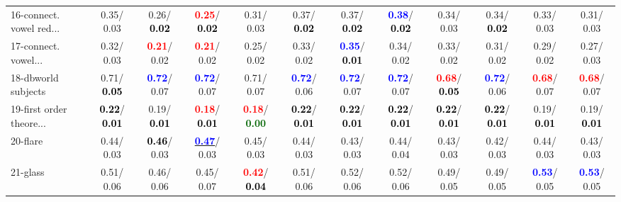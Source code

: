 \begin{table}[h]
\begin{center}
{\begin{tabular}{lc|c|c|c|c|c|c|c|c|c|c}
16-connect. vowel red... &   0.35/  0.03 &   0.26/\textcolor{black}{\textbf{  0.02}} & \textcolor{red}{\textbf{  0.25}}/\textcolor{black}{\textbf{  0.02}} &   0.31/  0.03 &   0.37/\textcolor{black}{\textbf{  0.02}} &   0.37/\textcolor{black}{\textbf{  0.02}} & \textcolor{blue}{\textbf{  0.38}}/\textcolor{black}{\textbf{  0.02}} &   0.34/  0.03 &   0.34/\textcolor{black}{\textbf{  0.02}} &   0.33/  0.03 &   0.31/  0.03 \\
17-connect. vowel... &   0.32/  0.03 & \textcolor{red}{\textbf{  0.21}}/  0.02 & \textcolor{red}{\textbf{  0.21}}/  0.02 &   0.25/  0.02 &   0.33/  0.02 & \textcolor{blue}{\textbf{  0.35}}/\textcolor{black}{\textbf{  0.01}} &   0.34/  0.02 &   0.33/  0.02 &   0.31/  0.02 &   0.29/  0.02 &   0.27/  0.03 \\
18-dbworld subjects &   0.71/\textcolor{black}{\textbf{  0.05}} & \textcolor{blue}{\textbf{  0.72}}/  0.07 & \textcolor{blue}{\textbf{  0.72}}/  0.07 &   0.71/  0.07 & \textcolor{blue}{\textbf{  0.72}}/  0.06 & \textcolor{blue}{\textbf{  0.72}}/  0.07 & \textcolor{blue}{\textbf{  0.72}}/  0.07 & \textcolor{red}{\textbf{  0.68}}/\textcolor{black}{\textbf{  0.05}} & \textcolor{blue}{\textbf{  0.72}}/  0.06 & \textcolor{red}{\textbf{  0.68}}/  0.07 & \textcolor{red}{\textbf{  0.68}}/  0.07 \\
19-first order theore... & \textcolor{black}{\textbf{  0.22}}/\textcolor{black}{\textbf{  0.01}} &   0.19/\textcolor{black}{\textbf{  0.01}} & \textcolor{red}{\textbf{  0.18}}/\textcolor{black}{\textbf{  0.01}} & \textcolor{red}{\textbf{  0.18}}/\textcolor{darkgreen}{\textbf{  0.00}} & \textcolor{black}{\textbf{  0.22}}/\textcolor{black}{\textbf{  0.01}} & \textcolor{black}{\textbf{  0.22}}/\textcolor{black}{\textbf{  0.01}} & \textcolor{black}{\textbf{  0.22}}/\textcolor{black}{\textbf{  0.01}} & \textcolor{black}{\textbf{  0.22}}/\textcolor{black}{\textbf{  0.01}} & \textcolor{black}{\textbf{  0.22}}/\textcolor{black}{\textbf{  0.01}} &   0.19/\textcolor{black}{\textbf{  0.01}} &   0.19/\textcolor{black}{\textbf{  0.01}} \\
20-flare &   0.44/  0.03 & \textcolor{black}{\textbf{  0.46}}/  0.03 & \underline{\textcolor{blue}{\textbf{  0.47}}}/  0.03 &   0.45/  0.03 &   0.44/  0.03 &   0.43/  0.03 &   0.44/  0.04 &   0.43/  0.03 &   0.42/  0.03 &   0.44/  0.03 &   0.43/  0.03 \\
21-glass &   0.51/  0.06 &   0.46/  0.06 &   0.45/  0.07 & \textcolor{red}{\textbf{  0.42}}/\textcolor{black}{\textbf{  0.04}} &   0.51/  0.06 &   0.52/  0.06 &   0.52/  0.06 &   0.49/  0.05 &   0.49/  0.05 & \textcolor{blue}{\textbf{  0.53}}/  0.05 & \textcolor{blue}{\textbf{  0.53}}/  0.05 \\ \hline

\end{tabular}}
\end{center}
\end{table}
